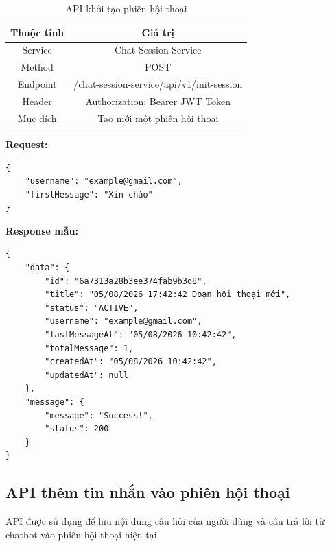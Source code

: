 \documentclass[../DoAn.tex]{subfiles}
\begin{document}
\begin{table}[H]
    \centering
    \renewcommand{\arraystretch}{1.7}
    \begin{tabular}{|c|c|}
        \hline
        \textbf{Thuộc tính} & \textbf{Giá trị}                          \\
        \hline
        Service             & Chat Session Service                      \\
        \hline
        Method              & POST                                      \\
        \hline
        Endpoint            & /chat-session-service/api/v1/init-session \\
        \hline
        Header              & Authorization: Bearer JWT Token           \\
        \hline
        Mục đích            & Tạo mới một phiên hội thoại               \\
        \hline
    \end{tabular}
    \caption{API khởi tạo phiên hội thoại}

\end{table}


\textbf{Request:}

\begin{verbatim}
{
    "username": "example@gmail.com",
    "firstMessage": "Xin chào"
}
\end{verbatim}


\textbf{Response mẫu:}

\begin{verbatim}
{
    "data": {
        "id": "6a7313a28b3ee374fab9b3d8",
        "title": "05/08/2026 17:42:42 Đoạn hội thoại mới",
        "status": "ACTIVE",
        "username": "example@gmail.com",
        "lastMessageAt": "05/08/2026 10:42:42",
        "totalMessage": 1,
        "createdAt": "05/08/2026 10:42:42",
        "updatedAt": null
    },
    "message": {
        "message": "Success!",
        "status": 200
    }
}
\end{verbatim}
\clearpage


\subsection{API thêm tin nhắn vào phiên hội thoại}
API được sử dụng để lưu nội dung câu hỏi của người dùng và câu trả lời từ chatbot vào phiên hội thoại hiện tại.
\end{document}
